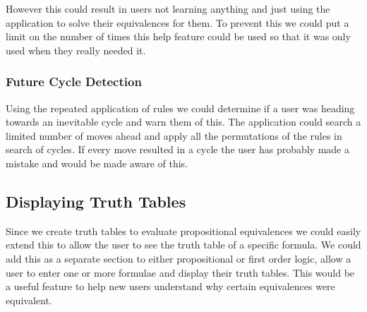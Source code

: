 \documentclass{report}
\begin{document}
However this could result in users not learning anything and just using the application to solve their equivalences for them. To prevent this we could put a limit on the number of times this help feature could be used so that it was only used when they really needed it.

\subsubsection{Future Cycle Detection}

Using the repeated application of rules we could determine if a user was heading towards an inevitable cycle and warn them of this. The application could search a limited number of moves ahead and apply all the permutations of the rules in search of cycles. If every move resulted in a cycle the user has probably made a mistake and would be made aware of this.

\subsection{Displaying Truth Tables}

Since we create truth tables to evaluate propositional equivalences we could easily extend this to allow the user to see the truth table of a specific formula. We could add this as a separate section to either propositional or first order logic, allow a user to enter one or more formulae and display their truth tables. This would be a useful feature to help new users understand why certain equivalences were equivalent.
\end{document}
